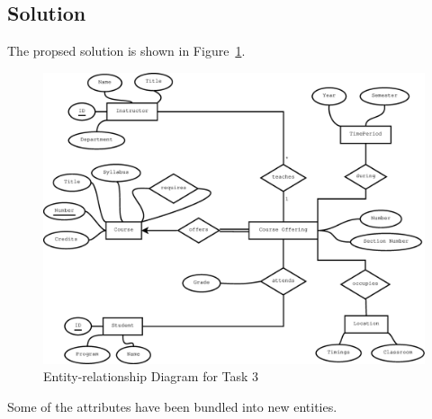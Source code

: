 \subsection{Solution}
The propsed solution is shown in Figure~\ref{fig:task3}.

\begin{figure}[htbp]
  \centering
  \includegraphics[width=\linewidth]{include/task3.eps}
    \caption{Entity-relationship Diagram for Task 3}
  \label{fig:task3}
\end{figure}

Some of the attributes have been bundled into new entities.
